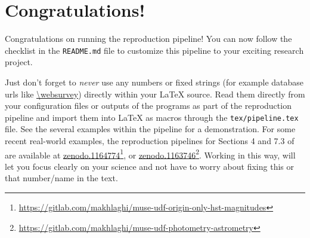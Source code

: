 \documentclass[10pt, twocolumn]{article}
\begin{document}

\thispagestyle{firststyle}





\section{Congratulations!}
Congratulations on running the reproduction pipeline! You can now follow
the checklist in the \texttt{README.md} file to customize this pipeline to
your exciting research project.

Just don't forget to \emph{never} use any numbers or fixed strings (for
example database urls like \url{\websurvey}) directly within your \LaTeX{}
source. Read them directly from your configuration files or outputs of the
programs as part of the reproduction pipeline and import them into \LaTeX{}
as macros through the \texttt{tex/pipeline.tex} file. See the several
examples within the pipeline for a demonstration. For some recent
real-world examples, the reproduction pipelines for Sections 4 and 7.3 of
\citet{bacon17} are available at
\href{https://doi.org/10.5281/zenodo.1164774}{zenodo.1164774}\footnote{\url{https://gitlab.com/makhlaghi/muse-udf-origin-only-hst-magnitudes}},
or
\href{https://doi.org/10.5281/zenodo.1163746}{zenodo.1163746}\footnote{\url{https://gitlab.com/makhlaghi/muse-udf-photometry-astrometry}}. Working
in this way, will let you focus clearly on your science and not have to
worry about fixing this or that number/name in the text.
\end{document}
